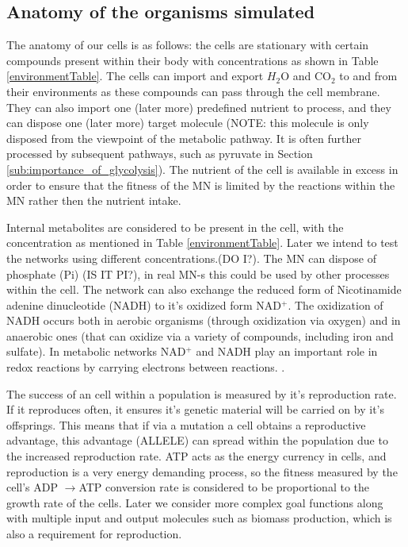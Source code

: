 \documentclass[10pt,a4paper]{article}
\begin{document}
	\subsection{Anatomy of the organisms simulated}
	\label{ssub:anatomy_of_the_oganisms_simulated}
	
	The anatomy of our cells is as follows: the cells are stationary with certain compounds present within their body with concentrations as shown in Table \ref{environmentTable}. The cells can import and export $H_2$O and CO$_2$ to and from their environments as these compounds can pass through the cell membrane. They can also import one (later more) predefined nutrient to process, and they can dispose  one (later more) target molecule (NOTE: this molecule is only disposed from the viewpoint of the metabolic pathway. It is often further processed by subsequent pathways, such as pyruvate in Section \ref{sub:importance_of_glycolysis}). The nutrient of the cell is available in excess in order to ensure that the fitness of the MN is limited by the reactions within the MN rather then the nutrient intake. 
	
	Internal metabolites are considered to be present in the cell, with the concentration as mentioned in Table \ref{environmentTable}. Later we intend to test the networks using different concentrations.(DO I?). The MN can dispose of phosphate (Pi) (IS IT PI?), in real MN-s this could be used by other processes within the cell. The network can also exchange the reduced form of Nicotinamide adenine dinucleotide (NADH) to it's oxidized form NAD$^+$. The oxidization of NADH occurs both in aerobic organisms (through oxidization via oxygen) and in anaerobic ones (that can oxidize via a variety of compounds, including iron and sulfate). In metabolic networks NAD$^+$ and NADH play an important role in redox reactions by carrying electrons between reactions. \cite{principlesofbio}.

	The success of an cell within a population is measured by it's reproduction rate. If it reproduces often, it ensures it's genetic material will be carried on by it's offsprings. This means that if via a mutation a cell obtains a reproductive advantage, this advantage (ALLELE)  can spread within the population due to the increased reproduction rate. ATP acts as the energy currency in cells, and reproduction is a very energy demanding process, so the fitness  measured by the cell's ADP $\rightarrow$ATP conversion rate is considered to be proportional to the growth rate of the cells. Later we consider more complex goal functions along with multiple input and output molecules such as biomass production, which is also a requirement for reproduction. 
\end{document}
